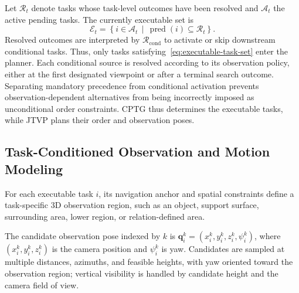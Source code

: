 \documentclass[letterpaper,10pt,journal]{IEEEtran}
\begin{document}
Let $\mathcal R_t$ denote tasks whose task-level outcomes have been resolved and $\mathcal A_t$ the active pending tasks. The currently executable set is
\begin{equation}
\mathcal E_t=
\left\{i\in\mathcal A_t\,\middle|\,
\operatorname{pred}(i)\subseteq\mathcal R_t\right\}.
\label{eq:executable-task-set}
\end{equation}
Resolved outcomes are interpreted by $\mathcal R_{\mathrm{cond}}$ to activate or skip downstream conditional tasks. Thus, only tasks satisfying~\eqref{eq:executable-task-set} enter the planner. Each conditional source is resolved according to its observation policy, either at the first designated viewpoint or after a terminal search outcome. Separating mandatory precedence from conditional activation prevents observation-dependent alternatives from being incorrectly imposed as unconditional order constraints. CPTG thus determines the executable tasks, while JTVP plans their order and observation poses.

\subsection{Task-Conditioned Observation and Motion Modeling}
\label{sec:jtvp}

For each executable task $i$, its navigation anchor and spatial constraints define a task-specific 3D observation region, such as an object, support surface, surrounding area, lower region, or relation-defined area.

The candidate observation pose indexed by $k$ is $\mathbf{q}_i^k=(x_i^k,y_i^k,z_i^k,\psi_i^k)$, where $(x_i^k,y_i^k,z_i^k)$ is the camera position and $\psi_i^k$ is yaw. Candidates are sampled at multiple distances, azimuths, and feasible heights, with yaw oriented toward the observation region; vertical visibility is handled by candidate height and the camera field of view.
\end{document}
